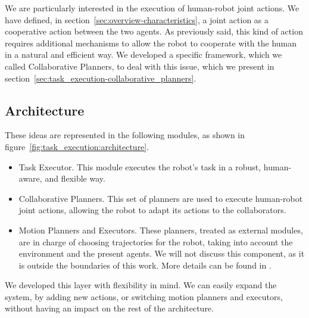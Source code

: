 We are particularly interested in the execution of human-robot joint actions. We have defined, in section~\ref{sec:overview-characteristics}, a joint action as a cooperative action between the two agents. As previously said, this kind of action requires additional mechanisms to allow the robot to cooperate with the human in a natural and efficient way. We developed a specific framework, which we called Collaborative Planners, to deal with this issue, which we present in section~\ref{sec:task_execution-collaborative_planners}.

\subsection{Architecture}

These ideas are represented in the following modules, as shown in figure~\ref{fig:task_execution:architecture}.
\begin{itemize}
	\item Task Executor. This module executes the robot's task in a robust, human-aware, and flexible way.
	\item Collaborative Planners. This set of planners are used to execute human-robot joint actions, allowing the robot to adapt its actions to the collaborators.
	\item Motion Planners and Executors. These planners, treated as external modules, are in charge of choosing trajectories for the robot, taking into account the environment and the present agents. We will not discuss this component, as it is outside the boundaries of this work. More details can be found in \cite{Sisbot2008,Mainprice2011,Pandey2010}.
\end{itemize}

We developed this layer with flexibility in mind. We can easily expand the system, by adding new actions, or switching motion planners and executors, without having an impact on the rest of the architecture.

